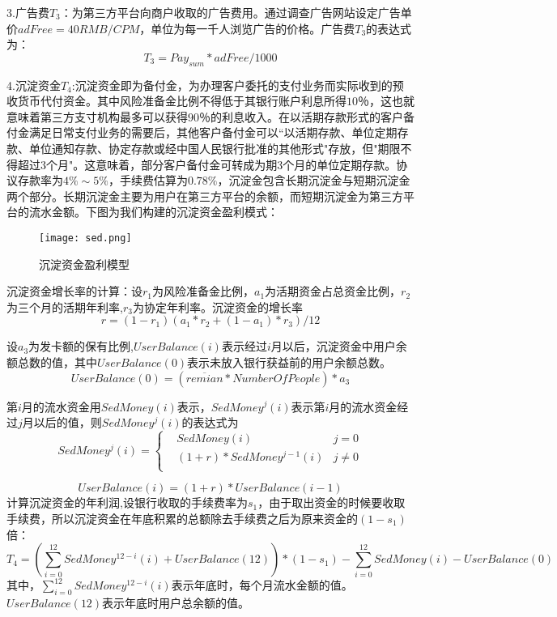 \documentclass[withoutpreface,bwprint]{cumcmthesis} %
\begin{document}
3.广告费$T_3$：为第三方平台向商户收取的广告费用。通过调查广告网站设定广告单价$adFree=40RMB/CPM$，单位为每一千人浏览广告的价格。广告费$T_3$的表达式为：
\begin{equation}
T_3=Pay_{sum}*adFree/1000
\end{equation}

4.沉淀资金$T_4$:沉淀资金即为备付金，为办理客户委托的支付业务而实际收到的预收货币代付资金。其中风险准备金比例不得低于其银行账户利息所得$10$％，这也就意味着第三方支寸机构最多可以获得$90$％的利息收入。在以活期存款形式的客户备付金满足日常支付业务的需要后，其他客户备付金可以“以活期存款、单位定期存款、单位通知存款、协定存款或经中国人民银行批准的其他形式"存放，但"期限不得超过3个月"。这意味着，部分客户备付金可转成为期3个月的单位定期存款。协议存款率为$4\%\sim5\%$，手续费估算为$0.78\%$，沉淀金包含长期沉淀金与短期沉淀金两个部分。长期沉淀金主要为用户在第三方平台的余额，而短期沉淀金为第三方平台的流水金额。下图为我们构建的沉淀资金盈利模式：

\begin{figure}[h]
\centering
\texttt{[image: sed.png]}
\caption{沉淀资金盈利模型}
\end{figure}

沉淀资金增长率的计算：设$r_1$为风险准备金比例，$a_1$为活期资金占总资金比例，$r_2$为三个月的活期年利率,$r_3$为协定年利率。沉淀资金的增长率
\begin{equation}
r=(1-r_1)(a_1*r_2+(1-a_1)*r_3)/12
\end{equation}

设$a_3$为发卡额的保有比例,$UserBalance(i)$表示经过$i$月以后，沉淀资金中用户余额总数的值，其中$UserBalance(0)$表示未放入银行获益前的用户余额总数。
\begin{equation}
UserBalance(0)=(\overline {remian} * {NumberOfPeople})*a_3
\end{equation}

第$i$月的流水资金用$SedMoney(i)$表示，$SedMoney^j(i)$表示第$i$月的流水资金经过$j$月以后的值，则$SedMoney^j(i)$的表达式为
\begin{equation}
SedMoney^j(i)=\left\{
\begin{aligned}
&SedMoney(i)  & j=0\\
&(1+r)*SedMoney^{j-1}(i)  & j\neq0\\
\end{aligned}
\right.
\end{equation}

\begin{equation}
UserBalance(i)=(1+r)*UserBalance(i-1)
\end{equation}
计算沉淀资金的年利润,设银行收取的手续费率为$s_1$，由于取出资金的时候要收取手续费，所以沉淀资金在年底积累的总额除去手续费之后为原来资金的$(1-s_1)$倍：
\begin{equation}
T_4=(\sum_{i=0}^{12} SedMoney^{12-i}(i)+UserBalance(12))*(1-s_1)-\sum_{i=0}^{12} SedMoney(i)-UserBalance(0)
\end{equation}
其中，$\sum_{i=0}^{12} SedMoney^{12-i}(i)$表示年底时，每个月流水金额的值。$UserBalance(12)$表示年底时用户总余额的值。
\end{document}
